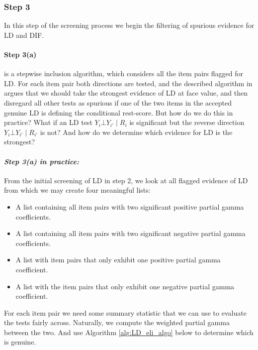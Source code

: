 \documentclass[a4project,12pt]{article}
\theoremstyle{examplestyle}
\theoremstyle{defstyle}
\theoremstyle{thmstyle}
\begin{document}
\subsubsection{Step 3}
In this step of the screening process we begin the filtering of spurious evidence for LD and DIF. 

\paragraph{Step 3(a)} is a stepwise inclusion algorithm, which considers all the item pairs flagged for LD. For each item pair both directions are tested, and the described algorithm in \cite{kreiner-christensen-2011} argues that we should take the strongest evidence of LD at face value, and then disregard all other tests as spurious if one of the two items in the accepted genuine LD is defining the conditional rest-score. But how do we do this in practice? What if an LD test $Y_i \bot Y_{i'} \mid R_i$ is significant but the reverse direction $Y_i \bot Y_{i'} \mid R_{i'}$ is not? And how do we determine which evidence for LD is the strongest?

\paragraph{\textit{Step 3(a) in practice:}} From the initial screening of LD in step 2, we look at all flagged evidence of LD from which we may create four meaningful lists:
\begin{itemize}
    \item A list containing all item pairs with two significant positive partial gamma coefficients.
    \item A list containing all item pairs with two significant negative partial gamma coefficients.
    \item A list with item pairs that only exhibit one positive partial gamma coefficient.
    \item A list with the item pairs that only exhibit one negative partial gamma coefficient. 
\end{itemize}
For each item pair we need some summary statistic that we can use to evaluate the tests fairly across. Naturally, we compute the weighted partial gamma between the two. And use Algorithm \ref{alg:LD_eli_algo} below to determine which is genuine.
\end{document}

